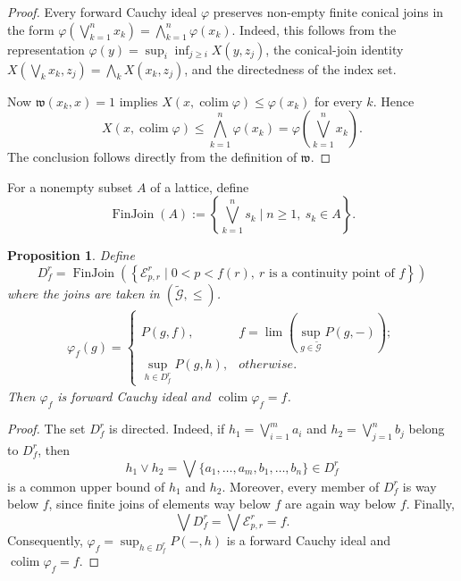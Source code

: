 \documentclass[preprint,3p,times]{elsarticle}
\theoremstyle{plain}
\newtheorem{prop}[thm]{Proposition}
\theoremstyle{definition}
\renewcommand{\phi}{\varphi}
\numberwithin{equation}{section}
\begin{document}
\begin{proof}
Every forward Cauchy ideal \(\phi\) preserves non-empty finite
conical joins in the form
\(\phi(\bigvee_{k=1}^n x_k)=\bigwedge_{k=1}^n\phi(x_k)\).
Indeed, this follows from the representation
\(\phi(y)=\sup_i\inf_{j\ge i}X(y,z_j)\), the conical-join identity
\(X(\bigvee_kx_k,z_j)=\bigwedge_kX(x_k,z_j)\), and the directedness
of the index set.

Now \(\mathfrak w(x_k,x)=1\) implies
\(X(x,\operatorname{colim}\phi)\le\phi(x_k)\) for every \(k\).
Hence
\[
X(x,\operatorname{colim}\phi)
\le\bigwedge_{k=1}^n\phi(x_k)
=\phi\left(\bigvee_{k=1}^n x_k\right).
\]
The conclusion follows directly from the definition of
\(\mathfrak w\).
\end{proof}
For a nonempty subset \(A\) of a lattice, define
\[
\operatorname{FinJoin}(A)
 :=\left\{\bigvee_{k=1}^{n}s_k
 \mid n\ge1,\ s_k\in A\right\}.
\]

\begin{prop}\label{fuzzy forward Cauchy ideal}
 Define
\[
D_f^r=
\operatorname{FinJoin}\left(
\left\{\mathcal E^r_{p,r}
\mid 0<p<f(r),\ r\text{ is a continuity point of }f\right\}
\right)
\]
where the joins are taken in
\((\widetilde{\mathcal G},\leq)\).
	\begin{align*}
		\phi_f(g)=\begin{cases}
			P(g,f), & f= \operatorname{lim} (\sup_{g\in\tilde{\mathcal{G} }} P(g,-)); \\
			\sup_{h\in D^r_f} P(g,h), & otherwise.
		\end{cases} 
	\end{align*}
	Then \( \phi_f \) is forward Cauchy ideal  and \(\operatorname{colim}\phi_f=f\).
\end{prop}
\begin{proof}
    The set \(D_f^r\) is directed. Indeed, if
\(h_1=\bigvee_{i=1}^{m}a_i\) and
\(h_2=\bigvee_{j=1}^{n}b_j\) belong to \(D_f^r\), then
\[
h_1\vee h_2
=
\bigvee\{a_1,\ldots,a_m,b_1,\ldots,b_n\}
\in D_f^r
\]
is a common upper bound of \(h_1\) and \(h_2\).
Moreover, every member of \(D_f^r\) is way below \(f\), since
finite joins of elements way below \(f\) are again way below \(f\).
Finally,
\[
\bigvee D_f^r=\bigvee\mathcal E^r_{p,r}=f.
\]
Consequently, \(\phi_f=\sup_{h\in D_f^r}P(-,h)\) is a forward
Cauchy ideal and \(\operatorname{colim}\phi_f=f\).
\end{proof}
\end{document}
